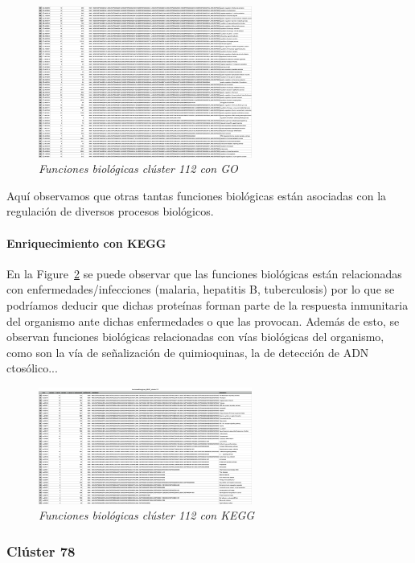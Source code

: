 \begin{figure}[h]
	\centering
	\includegraphics[width=70mm,scale=1.2]{figures/cluster112_GO_2.png}
	\caption{\textit{Funciones biológicas clúster 112 con GO}}
	\label{112-2go}
\end{figure}

Aquí observamos que otras tantas funciones biológicas están asociadas con la regulación de diversos procesos biológicos.

\paragraph{Enriquecimiento con KEGG}

En la Figure~\ref{112kegg} se puede observar que las funciones biológicas están relacionadas con enfermedades/infecciones (malaria, hepatitis B, tuberculosis) por lo que se podríamos deducir que dichas proteínas forman parte de la respuesta inmunitaria del organismo ante dichas enfermedades o que las provocan.
Además de esto, se observan funciones biológicas relacionadas con vías biológicas del organismo, como son la vía de señalización de quimioquinas, la de detección de ADN ctosólico...

\begin{figure}[h]
	\centering
	\includegraphics[width=70mm,scale=1.2]{figures/cluster112_KEGG.png}
	\caption{\textit{Funciones biológicas clúster 112 con KEGG}}
	\label{112kegg}
\end{figure}

\subsubsection{Clúster 78}

